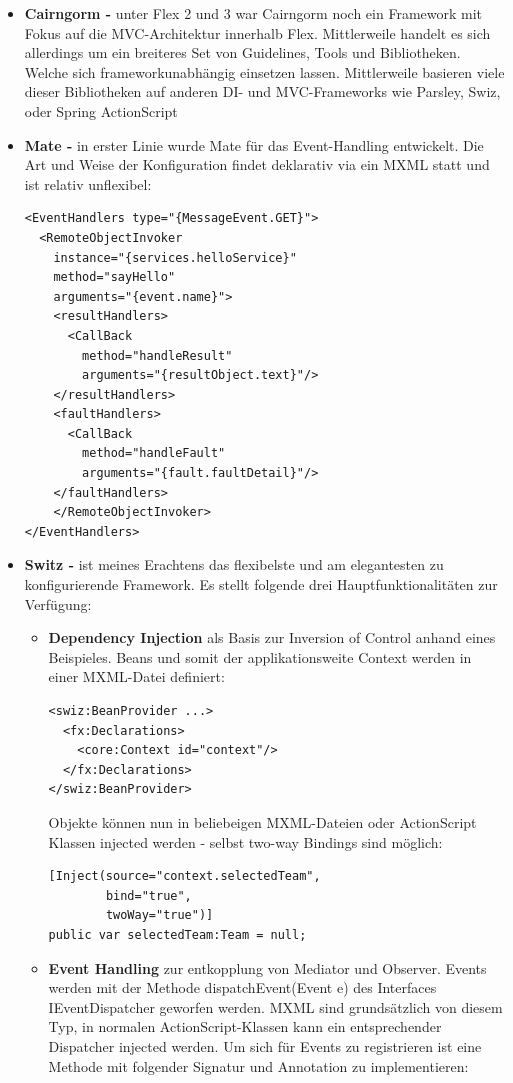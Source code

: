 \begin{itemize}
\item \textbf{Cairngorm\cite{Cairngorm} - } unter Flex 2 und 3 war Cairngorm noch ein Framework mit Fokus auf die MVC-Architektur innerhalb Flex. Mittlerweile handelt es sich allerdings um ein breiteres Set von Guidelines, Tools und Bibliotheken. Welche sich frameworkunabh\"angig einsetzen lassen. Mittlerweile basieren viele dieser Bibliotheken auf anderen DI- und MVC-Frameworks wie Parsley, Swiz, oder Spring ActionScript
\item \textbf{Mate\cite{Mate} - } in erster Linie wurde Mate f\"ur das Event-Handling entwickelt. Die Art und Weise der Konfiguration findet deklarativ via ein MXML statt und ist relativ unflexibel:

\begin{lstlisting}[caption=Event-Deklaration mit dem Mate Framework]
<EventHandlers type="{MessageEvent.GET}">
  <RemoteObjectInvoker 
    instance="{services.helloService}" 
    method="sayHello" 
    arguments="{event.name}">
    <resultHandlers>
      <CallBack 
        method="handleResult" 
        arguments="{resultObject.text}"/>
    </resultHandlers>
    <faultHandlers>
      <CallBack 
        method="handleFault" 
        arguments="{fault.faultDetail}"/>
    </faultHandlers>
    </RemoteObjectInvoker>
</EventHandlers>
\end{lstlisting}

\item \textbf{Switz\cite{Swiz} - }ist meines Erachtens das flexibelste und am elegantesten zu konfigurierende Framework. Es stellt folgende drei Hauptfunktionalit\"aten zur Verf\"ugung:
\begin{itemize}
	\item \textbf{Dependency Injection} als Basis zur Inversion of Control anhand eines Beispieles. Beans und somit der applikationsweite Context werden in einer MXML-Datei definiert:
\begin{lstlisting}[caption=Swiz: Bean Deklaration]
<swiz:BeanProvider ...>
  <fx:Declarations>
    <core:Context id="context"/>
  </fx:Declarations>
</swiz:BeanProvider>
\end{lstlisting}

Objekte k\"onnen nun in beliebeigen MXML-Dateien oder ActionScript Klassen injected werden - selbst two-way Bindings sind m\"oglich:
\begin{lstlisting}[caption=Swiz: Bean Injection]
[Inject(source="context.selectedTeam", 
        bind="true",
        twoWay="true")]
public var selectedTeam:Team = null;
\end{lstlisting}
\item \textbf{Event Handling} zur entkopplung von Mediator und Observer. Events werden mit der Methode dispatchEvent(Event e) des Interfaces IEventDispatcher geworfen werden. MXML sind grunds\"atzlich von diesem Typ, in normalen ActionScript-Klassen kann ein entsprechender Dispatcher injected werden. Um sich f\"ur Events zu registrieren ist eine Methode mit folgender Signatur und Annotation zu implementieren:


\end{itemize}
\end{itemize}
